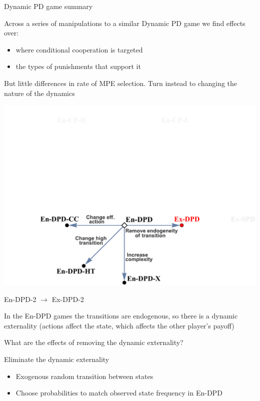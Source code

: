 \documentclass{beamer}
\begin{document}
\begin{frame}{Dynamic PD game summary}

\begin{card}
Across a series of manipulations to a similar Dynamic PD game we find
effects over:

\begin{itemize}
\item where conditional cooperation is targeted
\item the types of punishments that support it
\end{itemize}
But little differences in rate of MPE selection. Turn instead to changing the nature of the dynamics
\end{card}
\end{frame}

\begin{frame}
\begin{card}
\begin{center}\includegraphics[height=0.7\textwidth]{./i/FlowChart5.pdf}
\end{center}
\end{card}
\end{frame}

\begin{frame}{En-DPD-2 $\rightarrow$ Ex-DPD-2}
\begin{card}
 In the En-DPD games the transitions are endogenous, so there is a
dynamic externality (actions affect the state, which affects the other player's payoff)

What are the effects of removing the dynamic externality?
\end{card}
\pause

    \begin{card}[Manipulation 4:] 
    Eliminate the dynamic externality
        \begin{itemize}
        \item Exogenous random transition between states
        \item Choose probabilities to match observed state frequency in En-DPD
        \end{itemize}
    \end{card}
\end{frame}
\end{document}
